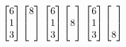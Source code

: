 \documentclass[]{article}
\begin{document}
\[\left[\begin{matrix}

6\\

1\\

3\\

\end{matrix}\right]

\left[\begin{matrix}

8\\

\\

\\

\end{matrix}\right]

\\

\left[\begin{matrix}

6\\

1\\

3\\

\end{matrix}\right]

\left[\begin{matrix}

\\

8\\

\\

\end{matrix}\right]

\\

\left[\begin{matrix}

6\\

1\\

3\\

\end{matrix}\right]

\left[\begin{matrix}

\\

\\

8\\

\end{matrix}\right]\]
\end{document}
